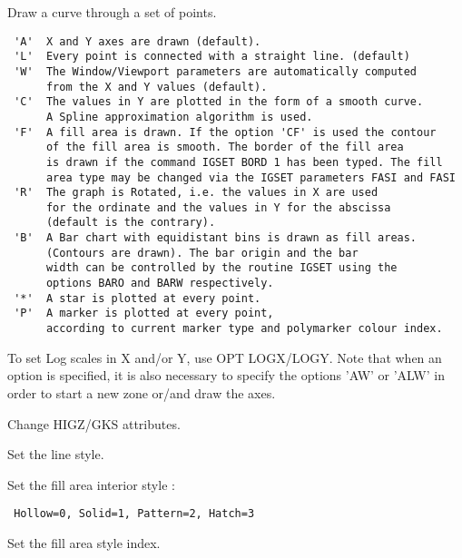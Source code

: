 \BEGARG
{}
\ENDARG
\BEGTEXT
Draw a curve through a set of points.
\begin{verbatim}
 'A'  X and Y axes are drawn (default).
 'L'  Every point is connected with a straight line. (default)
 'W'  The Window/Viewport parameters are automatically computed
      from the X and Y values (default).
 'C'  The values in Y are plotted in the form of a smooth curve.
      A Spline approximation algorithm is used.
 'F'  A fill area is drawn. If the option 'CF' is used the contour
      of the fill area is smooth. The border of the fill area
      is drawn if the command IGSET BORD 1 has been typed. The fill
      area type may be changed via the IGSET parameters FASI and FASI
 'R'  The graph is Rotated, i.e. the values in X are used
      for the ordinate and the values in Y for the abscissa
      (default is the contrary).
 'B'  A Bar chart with equidistant bins is drawn as fill areas.
      (Contours are drawn). The bar origin and the bar
      width can be controlled by the routine IGSET using the
      options BARO and BARW respectively.
 '*'  A star is plotted at every point.
 'P'  A marker is plotted at every point,
      according to current marker type and polymarker colour index.
\end{verbatim}
To set Log scales in X and/or Y, use OPT LOGX/LOGY.
Note that when an option is specified, it is also necessary to
specify the options 'AW' or 'ALW' in order to start a new zone
or/and draw the axes.
\ENDTEXT


\BEGTEXT
Change HIGZ/GKS attributes.
\ENDTEXT

\BEGARG
{}
\ENDARG
\BEGTEXT
Set the line style.
\ENDTEXT

\BEGARG
{}
\ENDARG
\BEGTEXT
Set the fill area interior style :
\begin{verbatim}
 Hollow=0, Solid=1, Pattern=2, Hatch=3
\end{verbatim}
\ENDTEXT

\BEGARG
{}
\ENDARG
\BEGTEXT
Set the fill area style index.
\ENDTEXT

